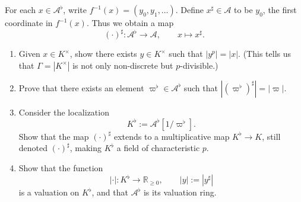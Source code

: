 \documentclass[12pt]{article}  %
\begin{document}
For each $x \in \mathcal{A}^\flat$, write $f^{-1}(x) = (y_0, y_1, \dots)$.  
Define $x^\sharp \in \mathcal{A}$ to be $y_0$, the first coordinate in $f^{-1}(x)$.  
Thus we obtain a map
\[
(\cdot)^\sharp : \mathcal{A}^\flat \to \mathcal{A}, \qquad x \mapsto x^\sharp.
\]

\begin{problem}[3]
\leavevmode
\begin{enumerate}[label=(\arabic*)]
\item Given $x \in K^\times$, show there exists $y \in K^\times$ such that $|y^p| = |x|$.  
(This tells us that $\Gamma = |K^\times|$ is not only non-discrete but $p$-divisible.)
\item Prove that there exists an element $\varpi^\flat \in \mathcal{A}^\flat$ such that $|(\varpi^\flat)^\sharp| = |\varpi|$.
\item Consider the localization 
\[
K^\flat := \mathcal{A}^\flat[1/\varpi^\flat].
\]
Show that the map $(\cdot)^\sharp$ extends to a multiplicative map $K^\flat \to K$, still denoted $(\cdot)^\sharp$, making $K^\flat$ a field of characteristic $p$.
\item Show that the function
\[
|\cdot| : K^\flat \to \mathbb{R}_{\ge 0}, \qquad |y| := |y^\sharp|
\]
is a valuation on $K^\flat$, and that $\mathcal{A}^\flat$ is its valuation ring.
\end{enumerate}
\end{problem}
\end{document}
